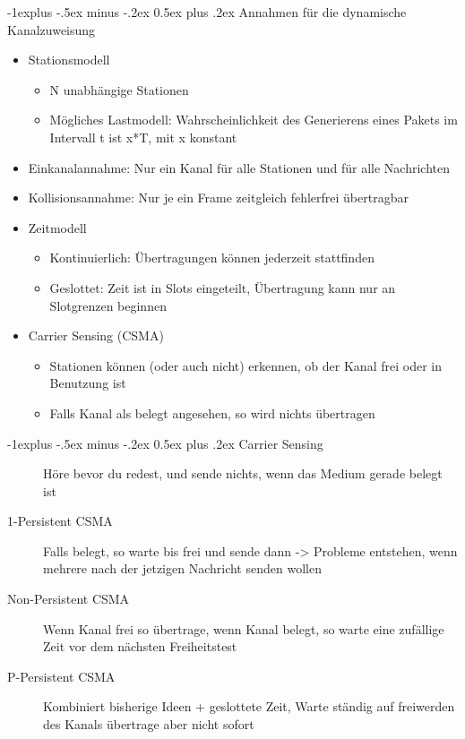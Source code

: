 \documentclass[10pt,landscape]{article}
\makeatletter
\renewcommand{\subsection}{\@startsection{subsection}{2}{0mm}%
                                {-1explus -.5ex minus -.2ex}%
                                {0.5ex plus .2ex}%
                                {\normalfont\normalsize\bfseries}}
\makeatother
\begin{document}
\begin{multicols}{3}
\subsection{Annahmen für die dynamische Kanalzuweisung}
\begin{itemize}
    \item Stationsmodell
    \begin{itemize}
        \item N unabhängige Stationen
        \item Mögliches Lastmodell: Wahrscheinlichkeit des Generierens eines Pakets im Intervall t ist x*T, mit x konstant
    \end{itemize}
    \item Einkanalannahme: Nur ein Kanal für alle Stationen und für alle Nachrichten
    \item Kollisionsannahme: Nur je ein Frame zeitgleich fehlerfrei übertragbar
    \item Zeitmodell
    \begin{itemize}
        \item Kontinuierlich: Übertragungen können jederzeit stattfinden
        \item Geslottet: Zeit ist in Slots eingeteilt, Übertragung kann nur an Slotgrenzen beginnen
    \end{itemize}
    \item Carrier Sensing (CSMA)
    \begin{itemize}
        \item Stationen können (oder auch nicht) erkennen, ob der Kanal frei oder in Benutzung ist
        \item Falls Kanal als belegt angesehen, so wird nichts übertragen
    \end{itemize}
\end{itemize}

\subsection{Carrier Sensing}
\begin{description}
    \item[] Höre bevor du redest, und sende nichts, wenn das Medium gerade belegt ist
    \item[1-Persistent CSMA] Falls belegt, so warte bis frei und sende dann -> Probleme entstehen, wenn mehrere nach der jetzigen Nachricht senden wollen
    \item[Non-Persistent CSMA] Wenn Kanal frei so übertrage, wenn Kanal belegt, so warte eine zufällige Zeit vor dem nächsten Freiheitstest
    \item[P-Persistent CSMA] Kombiniert bisherige Ideen + geslottete Zeit, Warte ständig auf freiwerden des Kanals übertrage aber nicht sofort
\end{description}


\end{multicols}
\end{document}
